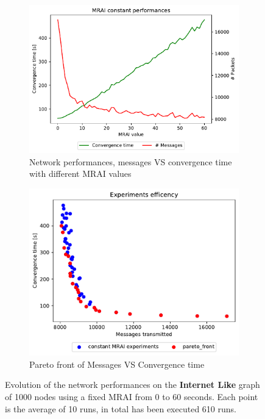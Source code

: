 \begin{figure}[h]
     \centering
     \begin{subfigure}[b]{0.45\textwidth}
         \centering
         \includegraphics[width=\textwidth]{images/internet_like/1000/constantMRAI/internet_like-constant_mrai_evolution.pdf}
		 \caption{Network performances, messages VS convergence time with different
			\ac{MRAI} values}
         \label{fig:internet_like_1000_constant_evolution_evolution}
     \end{subfigure}
     \hfill
     \begin{subfigure}[b]{0.45\textwidth}
         \centering
         \includegraphics[width=\textwidth]{images/internet_like/1000/constantMRAI/internet_like-constant.pdf}
		 \caption{Pareto front of Messages VS Convergence time}
         \label{fig:internet_like_1000_constant_evolution_paretoFront}
     \end{subfigure}
		\caption{Evolution of the network performances on the \textbf{Internet Like} graph
			of \num{1000} nodes using a fixed \ac{MRAI} from \num{0} to \num{60} seconds.
			Each point is the average of \num{10} runs, in total has been executed
			\num{610} runs.}
        \label{fig:internet_like_1000_constant_evolution}
\end{figure}

